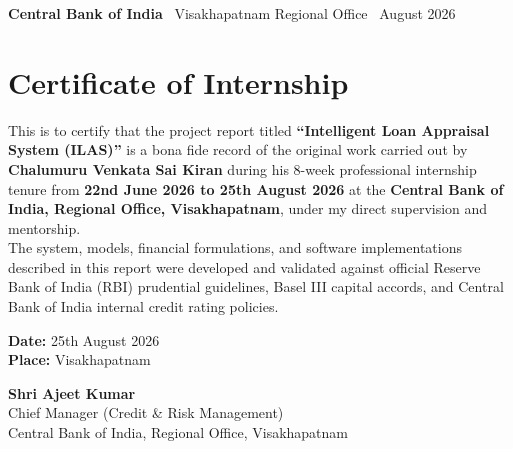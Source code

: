 \documentclass[11pt,a4paper,oneside]{report}
\begin{document}
\begin{titlepage}
\begin{center}
    \vfill
    {\small\textbf{Central Bank of India} \textbar\ Visakhapatnam Regional Office \textbar\ August 2026}
\end{center}
\end{titlepage}

\chapter*{Certificate of Internship}
This is to certify that the project report titled \textbf{``Intelligent Loan Appraisal System (ILAS)''} is a bona fide record of the original work carried out by \textbf{Chalumuru Venkata Sai Kiran} during his 8-week professional internship tenure from \textbf{22nd June 2026 to 25th August 2026} at the \textbf{Central Bank of India, Regional Office, Visakhapatnam}, under my direct supervision and mentorship.\\[0.4cm]
The system, models, financial formulations, and software implementations described in this report were developed and validated against official Reserve Bank of India (RBI) prudential guidelines, Basel III capital accords, and Central Bank of India internal credit rating policies.\\[1cm]
\noindent
\begin{minipage}{0.5\textwidth}
    \textbf{Date:} 25th August 2026\\
    \textbf{Place:} Visakhapatnam
\end{minipage}
\hfill
\begin{minipage}{0.45\textwidth}
    \begin{flushright}
        \textbf{Shri Ajeet Kumar}\\
        Chief Manager (Credit \& Risk Management)\\
        Central Bank of India, Regional Office, Visakhapatnam
    \end{flushright}
\end{minipage}

\newpage
\end{document}
